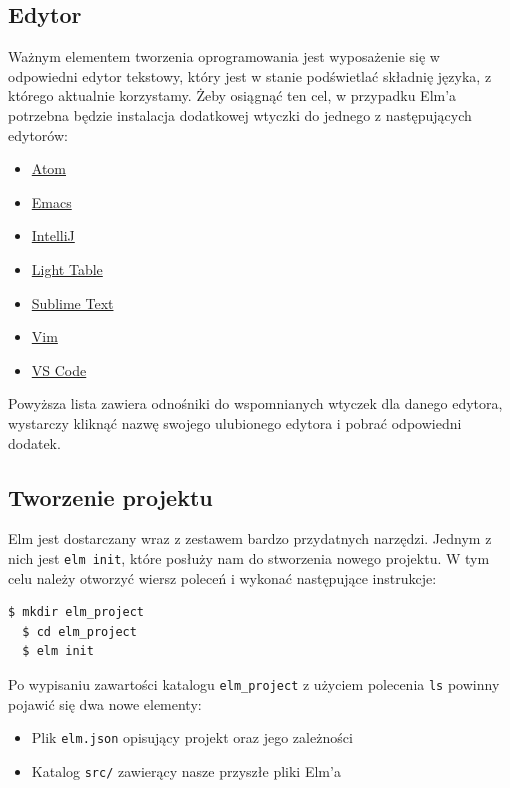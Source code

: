 \documentclass[twoside,a4paper]{report}
\begin{document}
\subsection{Edytor}
Ważnym elementem tworzenia oprogramowania jest wyposażenie się w odpowiedni edytor tekstowy, który jest w stanie podświetlać składnię języka, z którego aktualnie korzystamy.
Żeby osiągnąć ten cel, w przypadku Elm'a potrzebna będzie instalacja dodatkowej wtyczki do jednego z następujących edytorów:
\begin{itemize}[noitemsep,topsep=0pt]
    \item{\href{https://atom.io/packages/language-elm}{Atom}}
    \item{\href{https://github.com/jcollard/elm-mode}{Emacs}}
    \item{\href{https://github.com/klazuka/intellij-elm}{IntelliJ}}
    \item{\href{https://github.com/rundis/elm-light}{Light Table}}
    \item{\href{https://github.com/evancz/elm-syntax-highlighting/}{Sublime Text}}
    \item{\href{https://github.com/elm-tooling/elm-vim}{Vim}}
    \item{\href{https://github.com/elm-tooling/elm-language-client-vscode}{VS Code}}
\end{itemize}

Powyższa lista zawiera odnośniki do wspomnianych wtyczek dla danego edytora, wystarczy kliknąć nazwę swojego ulubionego edytora i pobrać odpowiedni dodatek.

\subsection{Tworzenie projektu}
Elm jest dostarczany wraz z zestawem bardzo przydatnych narzędzi.
Jednym z nich jest \texttt{elm init}, które posłuży nam do stworzenia nowego projektu.
W tym celu należy otworzyć wiersz poleceń i wykonać następujące instrukcje:
\begin{lstlisting}[language=bash]
  $ mkdir elm_project
  $ cd elm_project
  $ elm init
\end{lstlisting}

Po wypisaniu zawartości katalogu \texttt{elm\_project} z użyciem polecenia \texttt{ls} powinny pojawić się dwa nowe elementy:

\begin{itemize}[noitemsep,topsep=0pt]
    \item{Plik \texttt{elm.json} opisujący projekt oraz jego zależności}
    \item{Katalog \texttt{src/} zawierący nasze przyszłe pliki Elm'a}
\end{itemize}
\end{document}
